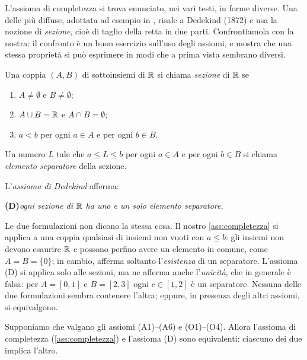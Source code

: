 L'assioma di completezza si trova enunciato, nei vari testi, in forme diverse. Una delle
più diffuse, adottata ad esempio in \cite{giusti}, risale a Dedekind (1872) e usa la
nozione di \emph{sezione}, cioè di taglio della retta in due parti. Confrontiamola con
la nostra: il confronto è un buon esercizio sull'uso degli assiomi, e mostra che una
stessa proprietà si può esprimere in modi che a prima vista sembrano diversi.

\begin{definizione}[Sezione di $\R$]\label{def:sezione}
Una coppia $(A,B)$ di sottoinsiemi di $\R$ si chiama \emph{sezione} di $\R$ se
\begin{enumerate}[label=\textup{(\roman*)}]
  \item $A\neq\emptyset$ e $B\neq\emptyset$;
  \item $A\cup B=\mathbb{R}$ e $A\cap B=\emptyset$;
  \item $a<b$ per ogni $a\in A$ e per ogni $b\in B$.
\end{enumerate}
Un numero $L$ tale che $a\le L\le b$ per ogni $a\in A$ e per ogni $b\in B$ si chiama
\emph{elemento separatore} della sezione.
\end{definizione}

L'\emph{assioma di Dedekind} afferma:
\begin{center}
\textbf{(D)}\enspace \emph{ogni sezione di $\R$ ha uno e un solo elemento separatore.}
\end{center}
Le due formulazioni non dicono la stessa cosa. Il nostro \cref{ass:completezza} si
applica a una coppia qualsiasi di insiemi non vuoti con $a\le b$: gli insiemi non devono
esaurire $\R$ e possono perfino avere un elemento in comune, come $A=B=\{0\}$; in cambio,
afferma soltanto l'\emph{esistenza} di un separatore. L'assioma (D) si applica solo alle
sezioni, ma ne afferma anche l'\emph{unicità}, che in generale è falsa: per $A=[0,1]$ e
$B=[2,3]$ ogni $c\in[1,2]$ è un separatore. Nessuna delle due formulazioni sembra
contenere l'altra; eppure, in presenza degli altri assiomi, si equivalgono.

\begin{teorema}\label{teo:dedekind-equivalente}
Supponiamo che valgano gli assiomi \textup{(A1)--(A6)} e \textup{(O1)--(O4)}. Allora
l'assioma di completezza (\cref{ass:completezza}) e l'assioma \textup{(D)} sono
equivalenti: ciascuno dei due implica l'altro.
\end{teorema}

